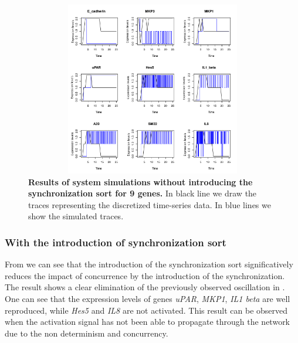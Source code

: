 \begin{figure}[!ht]
\centering
\includegraphics[width=5in,height=3in]{images/resultWOS.pdf}
\caption{{\bf Results of system simulations without introducing the synchronization sort for 9 genes.} In black line we draw the 
traces representing the discretized time-series data. In blue lines we show  the simulated traces.}
\label{fig:rwos}
\end{figure}
\subsubsection{With the introduction of synchronization sort}

From  we can see that the introduction of the synchronization sort significatively reduces the 
impact of concurrence by the introduction of the synchronization. The result shows  a 
clear elimination of the previously observed oscillation in . One can see that the expression levels of genes \emph{uPAR}, \emph{MKP1},
\emph{IL1 beta} are well reproduced, while \emph{Hes5} and \emph{IL8} are not activated. This result can be observed when the activation
signal has not been able to propagate through the network due to the non determinism  and concurrency.



